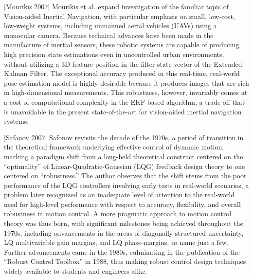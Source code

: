 [Mourikis 2007] Mourikis et al. expand investigation of the familiar topic of Vision-aided Inertial Navigation, with particular emphasis on small, low-cost, low-weight systems, including unmanned aerial vehicles (UAVs) using a monocular camera. Because technical advances have been made in the manufacture of inertial sensors, these robotic systems are capable of producing high precision state estimations even in uncontrolled urban environments, without utilizing a 3D feature position in the filter state vector of the Extended Kalman Filter. The exceptional accuracy produced in this real-time, real-world pose estimation model is highly desirable because it produces images that are rich in high-dimensional measurements. This robustness, however, invariably comes at a cost of computational complexity in the EKF-based algorithm, a trade-off that is unavoidable in the present state-of-the-art for vision-aided inertial navigation systems.

[Safanov 2007] Safonov revisits the decade of the 1970s, a period of transition in the theoretical framework underlying effective control of dynamic motion, marking a paradigm shift from a long-held theoretical construct centered on the ``optimality'' of Linear-Quadratic-Gaussian (LQG) feedback design theory to one centered on ``robustness.'' The author observes that the shift stems from the poor performance of the LQG controllers involving early tests in real-world scenarios, a problem later recognized as an inadequate level of attention to the real-world need for high-level performance with respect to accuracy, flexibility, and overall robustness in motion control. A more pragmatic approach to motion control theory was thus born, with significant milestones being achieved throughout the 1970s, including advancements in the areas of diagonally structured uncertainty, LQ multivariable gain margins, and LQ phase-margins, to name just a few. Further advancements came in the 1980s, culminating in the publication of the ``Robust Control Toolbox'' in 1988, thus making robust control design techniques widely available to students and engineers alike.

